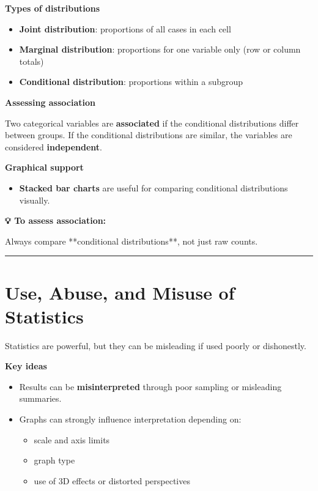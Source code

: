 \documentclass[
  11pt,
  oneside]{scrbook}
\providecommand{\tightlist}{%
  \setlength{\itemsep}{0pt}\setlength{\parskip}{0pt}}
\begin{document}
\textbf{Types of distributions}

\begin{itemize}
\tightlist
\item
  \textbf{Joint distribution}: proportions of all cases in each cell
\item
  \textbf{Marginal distribution}: proportions for one variable only (row or column totals)
\item
  \textbf{Conditional distribution}: proportions within a subgroup
\end{itemize}

\textbf{Assessing association}

Two categorical variables are \textbf{associated} if the conditional distributions differ between groups. If the conditional distributions are similar, the variables are considered \textbf{independent}.

\textbf{Graphical support}

\begin{itemize}
\tightlist
\item
  \textbf{Stacked bar charts} are useful for comparing conditional distributions visually.
\end{itemize}

\begin{tipbox}
\textbf{💡 To assess association:}

Always compare **conditional distributions**, not just raw counts.
\end{tipbox}

\begin{center}\rule{0.5\linewidth}{0.5pt}\end{center}

\section{Use, Abuse, and Misuse of Statistics}\label{use-abuse-and-misuse-of-statistics}

Statistics are powerful, but they can be misleading if used poorly or dishonestly.

\textbf{Key ideas}

\begin{itemize}
\tightlist
\item
  Results can be \textbf{misinterpreted} through poor sampling or misleading summaries.
\item
  Graphs can strongly influence interpretation depending on:

  \begin{itemize}
  \tightlist
  \item
    scale and axis limits
  \item
    graph type
  \item
    use of 3D effects or distorted perspectives
  \end{itemize}
\end{itemize}
\end{document}
